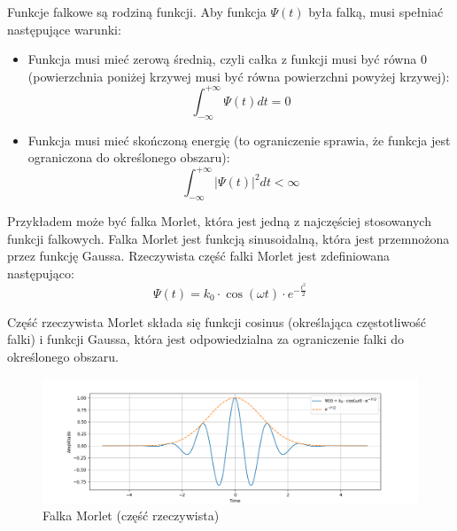 Funkcje falkowe są rodziną funkcji. Aby funkcja $\Psi(t)$ była falką, musi spełniać następujące warunki:
\begin{itemize}
    \item Funkcja musi mieć zerową średnią, czyli całka z funkcji musi być równa 0 (powierzchnia poniżej krzywej musi być równa powierzchni powyżej krzywej):
        \begin{equation*}
            \int_{-\infty}^{+\infty} \Psi(t) d t=0
        \end{equation*}
    \item Funkcja musi mieć skończoną energię (to ograniczenie sprawia, że funkcja jest ograniczona do określonego obszaru):
        \begin{equation*}
            \int_{-\infty}^{+\infty}|\Psi(t)|^{2} d t<\infty
        \end{equation*}
\end{itemize}

Przykładem może być falka Morlet, która jest jedną z najczęściej stosowanych funkcji falkowych. Falka Morlet jest funkcją sinusoidalną, która jest przemnożona przez funkcję Gaussa. Rzeczywista część falki Morlet jest zdefiniowana następująco:
\begin{equation*}
    \Psi(t)=k_0 \cdot \cos (\omega t) \cdot e^{-\frac{t^2}{2}}
\end{equation*}

Część rzeczywista Morlet składa się funkcji cosinus (określająca częstotliwość falki) i funkcji Gaussa, która jest odpowiedzialna za ograniczenie falki do określonego obszaru.

\begin{figure}[ht]
    \centering
    \begin{minipage}[t]{0.7\linewidth}
        \includegraphics[width=\linewidth]{Rozdziały/02.Podstawy_teoretyczne/Obrazy/morlet_e}
        \caption{Falka Morlet (część rzeczywista)}
        \label{fig:image29}
    \end{minipage}
\end{figure}

